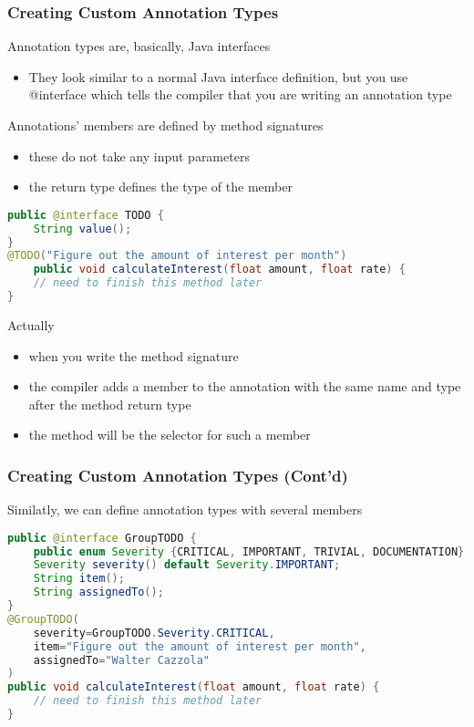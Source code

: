 \subsubsection{Creating Custom Annotation Types}

Annotation types are, basically, Java interfaces
\begin{itemize}
	\item They look similar to a normal Java interface definition, but you use @interface which tells the compiler that you are writing an annotation type
\end{itemize}

Annotations’ members are defined by method signatures
\begin{itemize}
	\item these do not take any input parameters
	\item the return type defines the type of the member
\end{itemize}

\begin{lstlisting}[language=Java]
public @interface TODO {
	String value();
}
@TODO("Figure out the amount of interest per month")
	public void calculateInterest(float amount, float rate) {
	// need to finish this method later
}
\end{lstlisting}

Actually
\begin{itemize}
	\item when you write the method signature
	\item the compiler adds a member to the annotation with the same name and type after the method return type
	\item the method will be the selector for such a member
\end{itemize}

\subsubsection{Creating Custom Annotation Types (Cont'd)}

Similatly, we can define  annotation types with several members

\begin{lstlisting}[language=Java]
public @interface GroupTODO {
	public enum Severity {CRITICAL, IMPORTANT, TRIVIAL, DOCUMENTATION};
	Severity severity() default Severity.IMPORTANT;
	String item();
	String assignedTo();
}
@GroupTODO(
	severity=GroupTODO.Severity.CRITICAL,
	item="Figure out the amount of interest per month",
	assignedTo="Walter Cazzola"
)
public void calculateInterest(float amount, float rate) {
	// need to finish this method later
}
\end{lstlisting}

